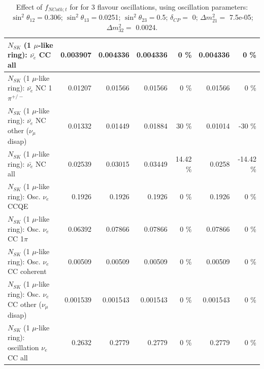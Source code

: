 \begin{table}
\begin{tabular}{| l | r | r | r  r | r  r |}
                            $N_{SK}$ (1 $\mu$-like ring): $\bar{\nu_{e}}$ CC all &        0.003907 &        0.004336 &        0.004336 &        0 \%  &        0.004336 &        0 \%  \\ 
\hline
                     $N_{SK}$ (1 $\mu$-like ring): $\bar{\nu_e}$ NC 1$\pi^{+/-}$ &         0.01207 &         0.01566 &         0.01566 &        0 \%  &         0.01566 &        0 \%  \\ 
          $N_{SK}$ (1 $\mu$-like ring): $\bar{\nu_e}$ NC other ($\nu_\mu$ disap) &         0.01332 &         0.01449 &         0.01884 &       30 \%  &         0.01014 &      -30 \%  \\ 
                            $N_{SK}$ (1 $\mu$-like ring): $\bar{\nu_{e}}$ NC all &         0.02539 &         0.03015 &         0.03449 &    14.42 \%  &          0.0258 &   -14.42 \%  \\ 
\hline
\hline
\hline
                                 $N_{SK}$ (1 $\mu$-like ring): Osc. $\nu_e$ CCQE &          0.1926 &          0.1926 &          0.1926 &        0 \%  &          0.1926 &        0 \%  \\ 
                            $N_{SK}$ (1 $\mu$-like ring): Osc. $\nu_e$ CC 1$\pi$ &         0.06392 &         0.07866 &         0.07866 &        0 \%  &         0.07866 &        0 \%  \\ 
                          $N_{SK}$ (1 $\mu$-like ring): Osc. $\nu_e$ CC coherent &         0.00509 &         0.00509 &         0.00509 &        0 \%  &         0.00509 &        0 \%  \\ 
           $N_{SK}$ (1 $\mu$-like ring): Osc. $\nu_e$ CC other ($\nu_\mu$ disap) &        0.001539 &        0.001543 &        0.001543 &        0 \%  &        0.001543 &        0 \%  \\ 
                        $N_{SK}$ (1 $\mu$-like ring): oscillation $\nu_e$ CC all &          0.2632 &          0.2779 &          0.2779 &        0 \%  &          0.2779 &        0 \%  \\ 
\hline
\hline
\end{tabular}
\caption{ Effect of $f_{NCoth; t}$ for for 3 flavour oscillations, using oscillation parameters:  $\sin^2\theta_{12} = $0.306; $\sin^2\theta_{13} = $0.0251; $\sin^2\theta_{23} = $0.5; $\delta_{CP} = $        0; $\Delta m^2_{21} = $    7.5e-05; $\Delta m^2_{32} = $    0.0024. }
\label{tab:num_xsec_norm_ncoth_1RmuT_3f_osc_t13:0.0251}
\end{table}
\clearpage
